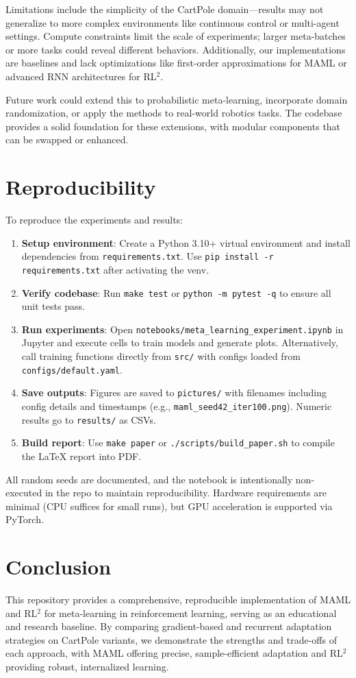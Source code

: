 \documentclass[11pt,a4paper]{article}
\begin{document}
Limitations include the simplicity of the CartPole domain—results may not generalize to more complex environments like continuous control or multi-agent settings. Compute constraints limit the scale of experiments; larger meta-batches or more tasks could reveal different behaviors. Additionally, our implementations are baselines and lack optimizations like first-order approximations for MAML or advanced RNN architectures for RL$^2$.

Future work could extend this to probabilistic meta-learning, incorporate domain randomization, or apply the methods to real-world robotics tasks. The codebase provides a solid foundation for these extensions, with modular components that can be swapped or enhanced.

\section{Reproducibility}
To reproduce the experiments and results:
\begin{enumerate}
  \item \textbf{Setup environment}: Create a Python 3.10+ virtual environment and install dependencies from \texttt{requirements.txt}. Use \texttt{pip install -r requirements.txt} after activating the venv.
  \item \textbf{Verify codebase}: Run \texttt{make test} or \texttt{python -m pytest -q} to ensure all unit tests pass.
  \item \textbf{Run experiments}: Open \texttt{notebooks/meta\_learning\_experiment.ipynb} in Jupyter and execute cells to train models and generate plots. Alternatively, call training functions directly from \texttt{src/} with configs loaded from \texttt{configs/default.yaml}.
  \item \textbf{Save outputs}: Figures are saved to \texttt{pictures/} with filenames including config details and timestamps (e.g., \texttt{maml\_seed42\_iter100.png}). Numeric results go to \texttt{results/} as CSVs.
  \item \textbf{Build report}: Use \texttt{make paper} or \texttt{./scripts/build\_paper.sh} to compile the LaTeX report into PDF.
\end{enumerate}

All random seeds are documented, and the notebook is intentionally non-executed in the repo to maintain reproducibility. Hardware requirements are minimal (CPU suffices for small runs), but GPU acceleration is supported via PyTorch.

\section{Conclusion}
This repository provides a comprehensive, reproducible implementation of MAML and RL$^2$ for meta-learning in reinforcement learning, serving as an educational and research baseline. By comparing gradient-based and recurrent adaptation strategies on CartPole variants, we demonstrate the strengths and trade-offs of each approach, with MAML offering precise, sample-efficient adaptation and RL$^2$ providing robust, internalized learning.
\end{document}
